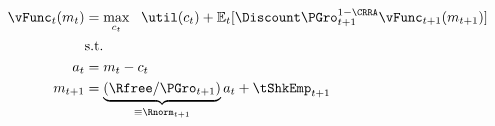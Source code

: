   \begin{equation}\begin{gathered}\begin{aligned}
    \null{\vFunc}_{t}({m}_{t})  & = \max_{{c}_{t}} ~~ \util({c}_{t})+
                                     \Ex_{t}[{\Discount} \PGro_{t+1}^{1-\CRRA}\null{\vFunc}_{t+1}({m}_{t+1})] \label{vtNorm}
    \\         & \text{s.t.} &     \\
    {a}_{t}    & = {m}_{t}-{c}_{t}
    \\      {m}_{t+1}  & = \underbrace{\left(\Rfree/\PGro_{t+1}\right)}_{\equiv \Rnorm_{t+1}}{a}_{t}+\tShkEmp_{t+1}
  \end{aligned}\end{gathered}\end{equation}
